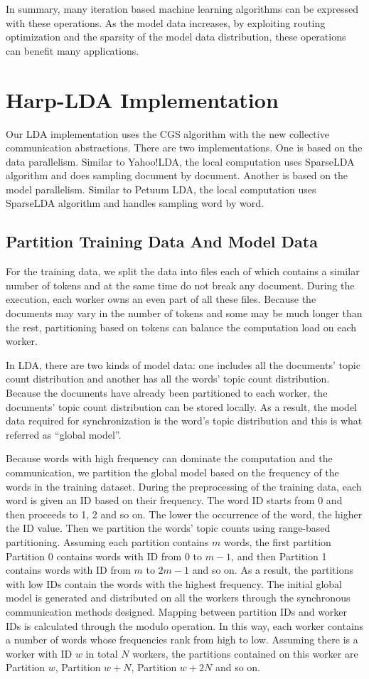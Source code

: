 \documentclass[conference]{IEEEtran}
\begin{document}
In summary, many iteration based machine learning algorithms
can be expressed with these operations. 
As the model data increases, by exploiting routing optimization 
and the sparsity of the model data distribution,
these operations can benefit many applications.
%
%
\section{Harp-LDA Implementation}
Our LDA implementation uses the CGS algorithm
with the new collective communication abstractions.
There are two implementations.
One is based on the data parallelism. Similar to Yahoo!LDA,
the local computation uses SparseLDA algorithm and
does sampling document by document.
Another is based on the model parallelism. Similar to Petuum LDA,
the local computation uses SparseLDA algorithm and handles sampling word by word. 

\subsection{Partition Training Data And Model Data}
For the training data,
we split the data into files each of which contains a similar number of tokens 
and at the same time do not break any document.
During the execution, each worker owns an even part of all these files. 
Because the documents may vary in the number of tokens 
and some may be much longer than the rest,
partitioning based on tokens can balance the computation load on each worker.

In LDA, there are two kinds of model data:
one includes all the documents' topic count distribution
and another has all the words' topic count distribution. 
Because the documents have already been partitioned to each worker,
the documents' topic count distribution can be stored locally.
As a result, the model data required for synchronization 
is the word's topic distribution and this is what referred as
``global model''.
 
Because words with high frequency
can dominate the computation and the communication, 
we partition the global model based on
the frequency of the words in the training dataset. 
During the preprocessing of the training data,
each word is given an ID based on their frequency. 
The word ID starts from 0 and then proceeds to 1, 2 and so on. 
The lower the occurrence of the word, the higher the ID value.
Then we partition the words' topic counts using range-based partitioning. 
Assuming each partition contains $m$ words, 
the first partition Partition 0 contains words with ID from 0 to $m-1$, 
and then Partition 1 contains words with ID from $m$ to $2m-1$ and so on. 
As a result, the partitions with low IDs
contain the words with the highest frequency. 
The initial global model is generated and distributed on all the workers 
through the synchronous communication methods designed.
Mapping between partition IDs and worker IDs
is calculated through the modulo operation.
In this way, each worker contains
a number of words whose frequencies rank from high to low.
Assuming there is a worker with ID $w$ in total $N$ workers,
the partitions contained on this worker are
Partition $w$, Partition $w+N$, Partition $w+2N$ and so on. 
\end{document}
